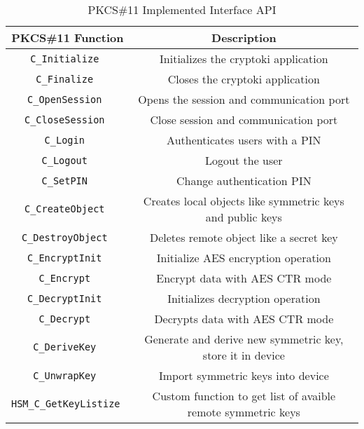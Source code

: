 \begin{table}[]
\centering
\def\arraystretch{1.5}
\begin{tabular}{|c|c|}
	\hline
	\textbf{PKCS\#11 Function} & \textbf{Description} \\ \hline
	\texttt{C\_Initialize		}& Initializes the cryptoki application\\ \hline
	\texttt{C\_Finalize		}& Closes the cryptoki application\\ \hline
	\texttt{C\_OpenSession		}& Opens the session and communication port\\ \hline
	\texttt{C\_CloseSession 	}& Close session and communication port\\ \hline
	\texttt{C\_Login        	}& Authenticates users with a PIN\\ \hline
	\texttt{C\_Logout        	}& Logout the user\\ \hline
	\texttt{C\_SetPIN       	}& Change authentication PIN\\ \hline
	\texttt{C\_CreateObject 	}& Creates local objects like symmetric keys and public keys\\ \hline
	\texttt{C\_DestroyObject	}& Deletes remote object like a secret key\\ \hline
	\texttt{C\_EncryptInit  	}& Initialize AES encryption operation\\ \hline
	\texttt{C\_Encrypt      	}& Encrypt data with AES CTR mode\\ \hline
	\texttt{C\_DecryptInit  	}& Initializes decryption operation\\ \hline
	\texttt{C\_Decrypt      	}& Decrypts data with AES CTR mode\\ \hline
	\texttt{C\_DeriveKey		}& Generate and derive new symmetric key, store it in device \\ \hline
	\texttt{C\_UnwrapKey		}& Import symmetric keys into device\\ \hline
	\texttt{HSM\_C\_GetKeyListize	}& Custom function to get list of avaible remote symmetric keys\\ \hline
\end{tabular}
\caption{PKCS\#11 Implemented Interface API}
\label{tab:pkcs11-api}
\end{table}
